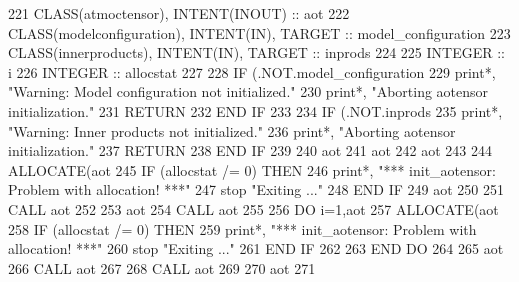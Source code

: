 \begin{DoxyCode}
221     \textcolor{keywordtype}{CLASS}(atmoctensor), \textcolor{keywordtype}{INTENT(INOUT)} :: aot
222     \textcolor{keywordtype}{CLASS}(modelconfiguration), \textcolor{keywordtype}{INTENT(IN)}, \textcolor{keywordtype}{TARGET} :: model\_configuration
223     \textcolor{keywordtype}{CLASS}(innerproducts), \textcolor{keywordtype}{INTENT(IN)}, \textcolor{keywordtype}{TARGET} :: inprods
224 
225     \textcolor{keywordtype}{INTEGER} :: i
226     \textcolor{keywordtype}{INTEGER} :: allocstat 
227 
228     \textcolor{keywordflow}{IF} (.NOT.model\_configuration%
229       print*, \textcolor{stringliteral}{"Warning: Model configuration not initialized."}
230       print*, \textcolor{stringliteral}{"Aborting aotensor initialization."}
231       \textcolor{keywordflow}{RETURN}
232 \textcolor{keywordflow}{    END IF}
233 
234     \textcolor{keywordflow}{IF} (.NOT.inprods%
235       print*, \textcolor{stringliteral}{"Warning: Inner products not initialized."}
236       print*, \textcolor{stringliteral}{"Aborting aotensor initialization."}
237       \textcolor{keywordflow}{RETURN}
238 \textcolor{keywordflow}{    END IF}
239 
240     aot%
241     aot%
242     aot%
243 
244     \textcolor{keyword}{ALLOCATE}(aot%
245     \textcolor{keywordflow}{IF} (allocstat /= 0) \textcolor{keywordflow}{THEN}
246       print*, \textcolor{stringliteral}{"*** init\_aotensor: Problem with allocation! ***"}
247       stop \textcolor{stringliteral}{"Exiting ..."}
248 \textcolor{keywordflow}{    END IF}
249     aot%
250 
251     \textcolor{keyword}{CALL }aot%
252 
253     aot%
254     \textcolor{keyword}{CALL }aot%
255 
256     \textcolor{keywordflow}{DO} i=1,aot%
257       \textcolor{keyword}{ALLOCATE}(aot%
258       \textcolor{keywordflow}{IF} (allocstat /= 0) \textcolor{keywordflow}{THEN}
259         print*, \textcolor{stringliteral}{"*** init\_aotensor: Problem with allocation! ***"}
260       stop \textcolor{stringliteral}{"Exiting ..."}
261 \textcolor{keywordflow}{    END IF}
262 
263 \textcolor{keywordflow}{    END DO}
264 
265     aot%
266     \textcolor{keyword}{CALL }aot%
267 
268     \textcolor{keyword}{CALL }aot%
269 
270     aot%
271 
\end{DoxyCode}
